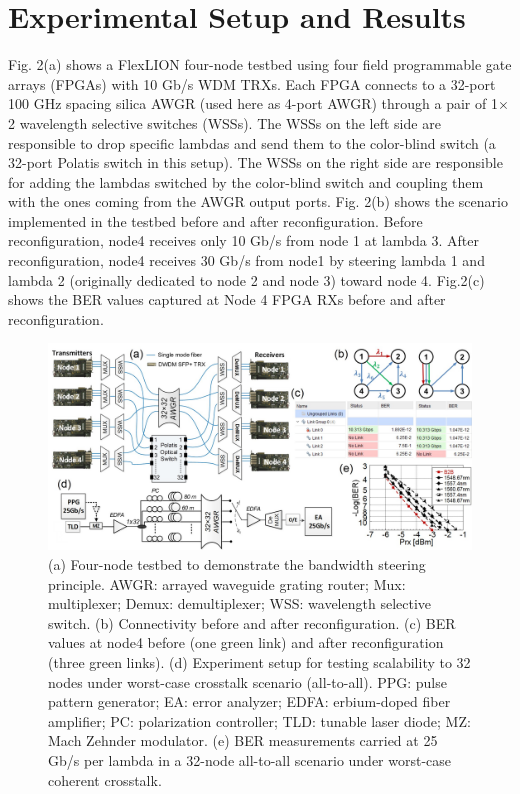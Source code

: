 \documentclass[letterpaper,10pt]{article}
\begin{document}
\section{Experimental Setup and Results}
Fig. 2(a) shows a FlexLION four-node testbed using four field programmable gate arrays (FPGAs) with 10 Gb/s WDM TRXs. Each FPGA connects to a 32-port 100 GHz spacing silica AWGR (used here as 4-port AWGR) through a pair of 1$\times$2 wavelength selective switches (WSSs). The WSSs on the left side are responsible to drop specific lambdas and send them to the color-blind switch (a 32-port Polatis switch in this setup). The WSSs on the right side are responsible for adding the lambdas switched by the color-blind switch and coupling them with the ones coming from the AWGR output ports. Fig. 2(b) shows the scenario implemented in the testbed before and after reconfiguration. Before reconfiguration, node4 receives only 10 Gb/s from node 1 at lambda 3. After reconfiguration, node4 receives 30 Gb/s from node1 by steering lambda 1 and lambda 2 (originally dedicated to node 2 and node 3) toward node 4. %
Fig.2(c) shows the BER values captured at Node 4 FPGA RXs before and after reconfiguration. 
\vspace{-2ex}
\begin{figure}[htbp]
  \centering
  \includegraphics[width=15cm]{Figure2_v3.jpg}
\caption{(a) Four-node testbed to demonstrate the bandwidth steering principle. AWGR: arrayed waveguide grating router; Mux: multiplexer; Demux: demultiplexer; WSS: wavelength selective switch. (b) Connectivity before and after reconfiguration. (c) BER values at node4 before (one green link) and after reconfiguration (three green links). (d) Experiment setup for testing scalability to 32 nodes under worst-case crosstalk scenario (all-to-all). PPG: pulse pattern generator; EA: error analyzer; EDFA: erbium-doped fiber amplifier; PC: polarization controller; TLD: tunable laser diode; MZ: Mach Zehnder modulator. (e) BER measurements carried at 25 Gb/s per lambda in a 32-node all-to-all scenario under worst-case coherent crosstalk.}
\vspace{-3ex}
\end{figure}
\end{document}
